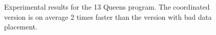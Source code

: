 \begin{figure}[ht!]
   \begin{center}
   \end{center}
   \caption{Experimental results for the 13 Queens program. The coordinated
      version is on average 2 times faster than the version with bad data
      placement.}
   \label{results:nqueens}
\end{figure}
